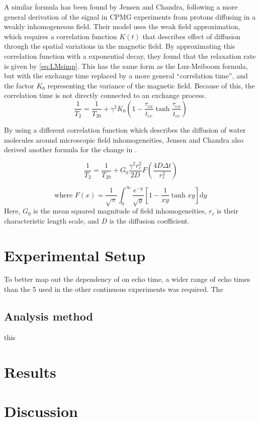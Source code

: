 A similar formula has been found by Jensen and Chandra, following a more general derivation of the signal in CPMG experiments from protons diffusing in a weakly inhomogeneous field\cite{JensenNMRrelaxationtissues2000}.
Their model uses the weak field approximation, which requires a correlation function $K(t)$ that describes effect of diffusion through the spatial variations in the magnetic field.
By approximating this correlation function with a exponential decay, they found that the relaxation rate is given by \autoref{eq:LMsimp}\cite{JensenNMRrelaxationtissues2000}.
This has the same form as the Luz-Meiboom formula, but with the exchange time replaced by a more general ``correlation time'', and the factor $K_0$ representing the variance of the magnetic field.
Because of this, the correlation time is not directly connected to an exchange process.
\begin{equation}
\label{eq:LMsimp}
\frac{1}{T_2} = \frac{1}{T_{20}} + \gamma^2 K_0 (1 - \frac{\tau_{ex}}{t_{ec}} \tanh{\frac{\tau_{ex}}{t_{ec}}})
\end{equation}

By using a different correlation function which describes the diffusion of water molecules around microscopic field inhomogeneities, Jensen and Chandra also derived another formula for the change in \Ttwo.

\begin{equation}
\label{eq:JC}
\frac{1}{T_2} = \frac{1}{T_{20}}+ G_0 \frac{\gamma^2 r_c^2}{2D} F(\frac{4D \Delta t}{r_c^2})
\end{equation}

\begin{displaymath}
\mbox{where  } F(x) = \frac{1}{\sqrt{\pi}} \int_0^\infty \frac{e^{-y}}{\sqrt{y}} \left[1-\frac{1}{xy} \tanh{xy}\right] \mathrm{d}y
\end{displaymath}
Here, $G_0$ is the mean squared magnitude of field inhomogeneities, $r_c$ is their characteristic length scale, and $D$ is the diffusion coefficient.

\section{Experimental Setup}
To better map out the dependency of \Ttwo on echo time, a wider range of echo times than the 5 used in the other continuous experiments was required.
The

\subsection*{Analysis method}
this
\section{Results}

\section{Discussion}
